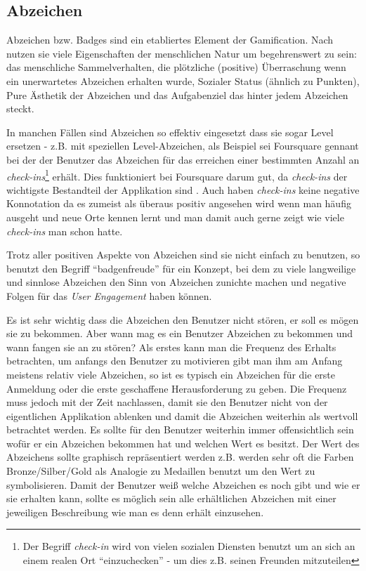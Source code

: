 \documentclass[12pt,twoside]{book}
\begin{document}
\subsection{Abzeichen}
Abzeichen bzw. Badges sind ein etabliertes Element der Gamification. Nach \citep{zichermann2011gamification, 55} nutzen sie viele Eigenschaften der menschlichen Natur um begehrenswert zu sein: das menschliche Sammelverhalten, die plötzliche (positive) Überraschung wenn ein unerwartetes Abzeichen erhalten wurde, Sozialer Status (ähnlich zu Punkten), Pure Ästhetik der Abzeichen und das Aufgabenziel das hinter jedem Abzeichen steckt.

In manchen Fällen sind Abzeichen so effektiv eingesetzt dass sie sogar Level ersetzen - z.B. mit speziellen Level-Abzeichen, als Beispiel sei Foursquare gennant bei der der Benutzer das Abzeichen für das erreichen einer bestimmten Anzahl an \textit{check-ins}\footnote{Der Begriff \textit{check-in} wird von vielen sozialen Diensten benutzt um an sich an einem realen Ort ``einzuchecken'' - um dies z.B. seinen Freunden mitzuteilen} erhält. Dies funktioniert bei Foursquare darum gut, da \textit{check-ins} der wichtigste Bestandteil der Applikation sind \citep{zichermann2011gamification, 57}. Auch haben \textit{check-ins} keine negative Konnotation da es zumeist als überaus positiv angesehen wird wenn man häufig ausgeht und neue Orte kennen lernt und man damit auch gerne zeigt wie viele \textit{check-ins} man schon hatte.

Trotz aller positiven Aspekte von Abzeichen sind sie nicht einfach zu benutzen, so benutzt \citep{zichermann2011gamification, 56} den Begriff ``badgenfreude'' für ein Konzept, bei dem zu viele langweilige und sinnlose Abzeichen den Sinn von Abzeichen zunichte machen und negative Folgen für das \textit{User Engagement} haben können.

Es ist sehr wichtig dass die Abzeichen den Benutzer nicht stören, er soll es mögen sie zu bekommen. Aber wann mag es ein Benutzer Abzeichen zu bekommen und wann fangen sie an zu stören?
Als erstes kann man die Frequenz des Erhalts betrachten, um anfangs den Benutzer zu motivieren gibt man ihm am Anfang meistens relativ viele Abzeichen, so ist es typisch ein Abzeichen für die erste Anmeldung oder die erste geschaffene Herausforderung zu geben.
Die Frequenz muss jedoch mit der Zeit nachlassen, damit sie den Benutzer nicht von der eigentlichen Applikation ablenken und damit die Abzeichen weiterhin als wertvoll betrachtet werden.
Es sollte für den Benutzer weiterhin immer offensichtlich sein wofür er ein Abzeichen bekommen hat und welchen Wert es besitzt. Der Wert des Abzeichens sollte graphisch repräsentiert werden z.B. werden sehr oft die Farben Bronze/Silber/Gold als Analogie zu Medaillen benutzt um den Wert zu symbolisieren.
Damit der Benutzer weiß welche Abzeichen es noch gibt und wie er sie erhalten kann, sollte es möglich sein alle erhältlichen Abzeichen mit einer jeweiligen Beschreibung wie man es denn erhält einzusehen.
\end{document}
